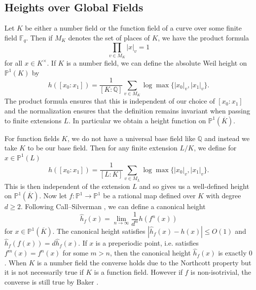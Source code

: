 \documentclass[10pt]{amsart}
\newcommand{\bb}{\mathbb}
\newcommand{\ovl}{\overline}
\newcommand{\h}{\widehat{h}}
\numberwithin{theorem}{section}
\numberwithin{example}{section}
\numberwithin{definition}{section}
\begin{document}
\subsection{Heights over Global Fields}
Let $K$ be either a number field or the function field of a curve over some finite field $\bb{F}_q$. Then if $M_K$ denotes the set of places of $K$, we have the product formula 
$$\prod_{v \in M_K} |x|_v = 1$$
for all $x \in K^{\times}$. If $K$ is a number field, we can define the absolute Weil height on $\bb{P}^{1}(K)$ by 
$$h([x_0:x_1]) = \frac{1}{[K:\bb{Q}]} \sum_{v \in M_K} \log \max\{|x_0|_v, |x_1|_v\}.$$
The product formula ensures that this is independent of our choice of $[x_0:x_1]$ and the normalization ensures that the definition remains invariant when passing to finite extensions $L$. In particular we obtain a height function on $\bb{P}^1(\ovl{K})$. 
\par For function fields $K$, we do not have a universal base field like $\bb{Q}$ and instead we take $K$ to be our base field. Then for any finite extension $L/K$, we define for $x \in \bb{P}^1(L)$
$$h([x_0:x_1]) = \frac{1}{[L:K]} \sum_{v \in M_L} \log \max\{|x_0|_v, |x_1|_v\}.$$
This is then independent of the extension $L$ and so gives us a well-defined height on $\bb{P}^1(\ovl{K})$. Now let $f: \bb{P}^1 \to \bb{P}^1$ be a rational map defined over $K$ with degree $d \geq 2$. Following Call--Silverman \cite{CS93}, we can define a canonical height 
$$\h_f(x) = \lim_{n \to \infty} \frac{1}{d^n} h(f^n(x))$$
for $x \in \bb{P}^1(\ovl{K})$. The canonical height satisfies $|\h_f(x) - h(x)| \leq O(1)$ and $\h_f(f(x)) = d \h_f(x)$. If $x$ is a preperiodic point, i.e. satisfies $f^m(x) = f^n(x)$ for some $m > n$, then the canonical height $\h_f(x)$ is exactly $0$. When $K$ is a number field the converse holds due to the Northcott property but it is not necessarily true if $K$ is a function field. However if $f$ is non-isotrivial, the converse is still true by Baker \cite{Bak09}.
\end{document}
